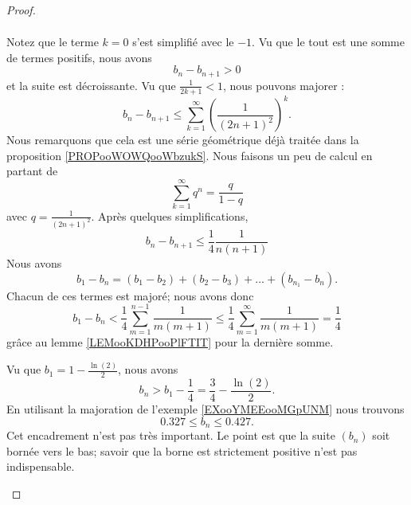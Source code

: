 \begin{proof}
\begin{subproof}
\begin{subequations}
\begin{align}
			\end{align}
		\end{subequations}
		Notez que le terme \( k=0\) s'est simplifié avec le \( -1\). Vu que le tout est une somme de termes positifs, nous avons
		\begin{equation}
			b_n-b_{n+1}>0
		\end{equation}
		et la suite est décroissante.
		Vu que \( \frac{1}{ 2k+1 }<1\), nous pouvons majorer :
		\begin{equation}
			b_n-b_{n+1}\leq \sum_{k=1}^{\infty}\left( \frac{1}{ (2n+1)^2 } \right)^k.
		\end{equation}
		Nous remarquons que cela est une série géométrique déjà traitée dans la proposition \ref{PROPooWOWQooWbzukS}. Nous faisons un peu de calcul en partant de
		\begin{equation}
			\sum_{k=1}^{\infty}q^n=\frac{ q }{ 1-q }
		\end{equation}
		avec \( q=\frac{1}{ (2n+1)^2 }\). Après quelques simplifications,
		\begin{equation}
			b_n-b_{n+1}\leq \frac{1}{ 4 }\frac{ 1 }{ n(n+1) }
		\end{equation}
		Nous avons
		\begin{equation}
			b_1-b_n=(b_1-b_2)+(b_2-b_3)+\ldots+(b_{n_1}-b_n).
		\end{equation}
		Chacun de ces termes est majoré; nous avons donc
		\begin{equation}
			b_1-b_n<\frac{1}{ 4 }\sum_{m=1}^{n-1}\frac{1}{ m(m+1) }\leq \frac{1}{ 4 }\sum_{m=1}^{\infty}\frac{1}{ m(m+1) }=\frac{1}{ 4 }
		\end{equation}
		grâce au lemme \ref{LEMooKDHPooPlFTIT} pour la dernière somme.

		Vu que \( b_1=1-\frac{ \ln(2) }{2}\), nous avons
		\begin{equation}
			b_n>b_1-\frac{1}{ 4 }=\frac{ 3 }{ 4 }-\frac{ \ln(2) }{ 2 }.
		\end{equation}
		En utilisant la majoration de l'exemple \ref{EXooYMEEooMGpUNM} nous trouvons
		\begin{equation}
			0.327\leq b_n\leq 0.427.
		\end{equation}
		Cet encadrement n'est pas très important. Le point est que la suite \( (b_n)\) soit bornée vers le bas; savoir que la borne est strictement positive n'est pas indispensable.


\end{subproof}
\end{proof}

